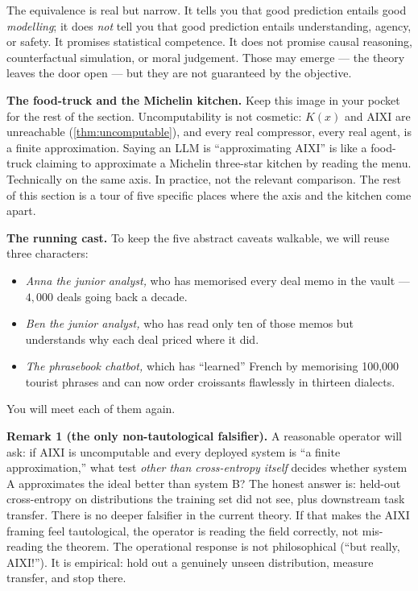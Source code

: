 \begin{intuition}
The equivalence is real but narrow. It tells you that good prediction
entails good \emph{modelling}; it does \emph{not} tell you that good
prediction entails understanding, agency, or safety. It promises
statistical competence. It does not promise causal reasoning,
counterfactual simulation, or moral judgement. Those may emerge ---
the theory leaves the door open --- but they are not guaranteed by
the objective.

\medskip

\noindent\textbf{The food-truck and the Michelin kitchen.} Keep this
image in your pocket for the rest of the section. Uncomputability is
not cosmetic: $K(x)$ and AIXI are unreachable
(\cref{thm:uncomputable}), and every real compressor, every real
agent, is a finite approximation. Saying an LLM is
``approximating AIXI'' is like a food-truck claiming to approximate
a Michelin three-star kitchen by reading the menu. Technically on
the same axis. In practice, not the relevant comparison. The rest
of this section is a tour of five specific places where the axis
and the kitchen come apart.

\medskip

\noindent\textbf{The running cast.} To keep the five abstract
caveats walkable, we will reuse three characters:

\begin{itemize}[leftmargin=1.2em,itemsep=2pt]
  \item \emph{Anna the junior analyst,} who has memorised every deal
        memo in the vault --- $4{,}000$ deals going back a decade.
  \item \emph{Ben the junior analyst,} who has read only ten of those
        memos but understands why each deal priced where it did.
  \item \emph{The phrasebook chatbot,} which has ``learned'' French by
        memorising 100{,}000 tourist phrases and can now order
        croissants flawlessly in thirteen dialects.
\end{itemize}

You will meet each of them again.

\medskip

\noindent\textbf{Remark 1 (the only non-tautological falsifier).}
A reasonable operator will ask: if AIXI is uncomputable and every
deployed system is ``a finite approximation,'' what test \emph{other
than cross-entropy itself} decides whether system A approximates the
ideal better than system B? The honest answer is: held-out
cross-entropy on distributions the training set did not see, plus
downstream task transfer. There is no deeper falsifier in the
current theory. If that makes the AIXI framing feel tautological,
the operator is reading the field correctly, not mis-reading the
theorem. The operational response is not philosophical (``but
really, AIXI!''). It is empirical: hold out a genuinely unseen
distribution, measure transfer, and stop there.


\end{intuition}
